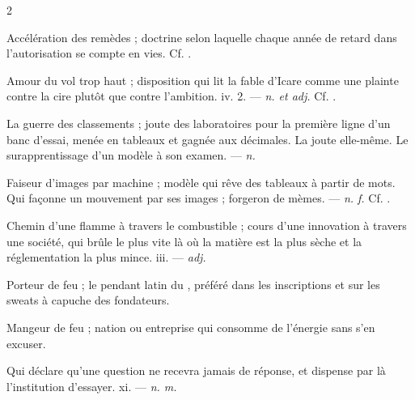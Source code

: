 \begin{multicols}{2}

 Accélération des remèdes ; doctrine selon laquelle chaque année de retard dans l'autorisation se compte en vies. Cf. .

 Amour du vol trop haut ; disposition qui lit la fable d'Icare comme une plainte contre la cire plutôt que contre l'ambition.   iv. 2. —  \textit{n. et adj.} Cf. .

 La guerre des classements ; joute des laboratoires pour la première ligne d'un banc d'essai, menée en tableaux et gagnée aux décimales.  La joute elle-même.   Le surapprentissage d'un modèle à son examen.   —  \textit{n.}

  Faiseur d'images par machine ; modèle qui rêve des tableaux à partir de mots.   Qui façonne un mouvement par ses images ; forgeron de mèmes. —  \textit{n. f.} Cf. .

 Chemin d'une flamme à travers le combustible ;  cours d'une innovation à travers une société, qui brûle le plus vite là où la matière est la plus sèche et la réglementation la plus mince.   iii. —  \textit{adj.}

 Porteur de feu ; le pendant latin du , préféré dans les inscriptions et sur les sweats à capuche des fondateurs.

 Mangeur de feu ; nation ou entreprise qui consomme de l'énergie sans s'en excuser.

 Qui déclare qu'une question ne recevra jamais de réponse, et dispense par là l'institution d'essayer.   xi. —  \textit{n. m.}


\end{multicols}
